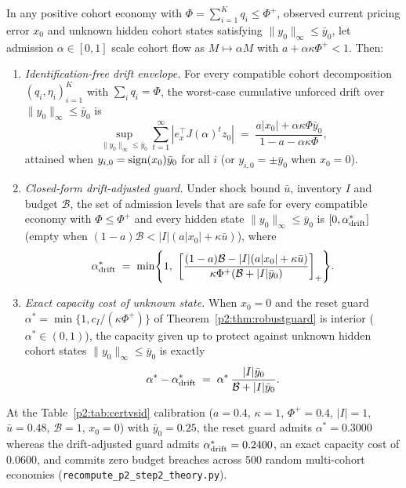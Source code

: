 \begin{proposition}\label{p2:prop:driftguard}
In any positive cohort economy with $\Phi=\sum_{i=1}^K q_i\le\Phi^+$, observed current pricing error $x_0$ and unknown hidden cohort states satisfying $\|y_0\|_\infty\le\bar y_0$, let admission $\alpha\in[0,1]$ scale cohort flow as $M\mapsto\alpha M$ with $a+\alpha\kappa\Phi^+<1$. Then:
\begin{enumerate}[label=(\roman*)]
\item \emph{Identification-free drift envelope.} For every compatible cohort decomposition $(q_i,\eta_i)_{i=1}^K$ with $\sum_i q_i=\Phi$, the worst-case cumulative unforced drift over $\|y_0\|_\infty\le\bar y_0$ is
\begin{equation}\label{p2:eq:driftenv}
\sup_{\|y_0\|_\infty\le\bar y_0}\sum_{t=1}^\infty |e_x^\top J(\alpha)^t z_0|\;=\;\frac{a|x_0|+\alpha\kappa\Phi\bar y_0}{1-a-\alpha\kappa\Phi},
\end{equation}
attained when $y_{i,0}={\rm sign}(x_0)\bar y_0$ for all $i$ (or $y_{i,0}=\pm\bar y_0$ when $x_0=0$).
\item \emph{Closed-form drift-adjusted guard.} Under shock bound $\bar u$, inventory $I$ and budget $\mathcal B$, the set of admission levels that are safe for every compatible economy with $\Phi\le\Phi^+$ and every hidden state $\|y_0\|_\infty\le\bar y_0$ is $[0,\alpha_{\rm drift}^*]$ (empty when $(1-a)\mathcal B<|I|(a|x_0|+\kappa\bar u)$), where
\begin{equation}\label{p2:eq:alphadrift}
\alpha_{\rm drift}^*\;=\;\min\Biggl\{1,\ \biggl[\frac{(1-a)\mathcal B-|I|(a|x_0|+\kappa\bar u)}{\kappa\Phi^+(\mathcal B+|I|\bar y_0)}\biggr]_+\Biggr\}.
\end{equation}
\item \emph{Exact capacity cost of unknown state.} When $x_0=0$ and the reset guard $\alpha^*=\min\{1,c_I/(\kappa\Phi^+)\}$ of Theorem~\ref{p2:thm:robustguard} is interior ($\alpha^*\in(0,1)$), the capacity given up to protect against unknown hidden cohort states $\|y_0\|_\infty\le\bar y_0$ is exactly
\begin{equation}\label{p2:eq:driftcost}
\alpha^*-\alpha_{\rm drift}^*\;=\;\alpha^*\,\frac{|I|\bar y_0}{\mathcal B+|I|\bar y_0}.
\end{equation}
\end{enumerate}
\end{proposition}

At the Table~\ref{p2:tab:certvsid} calibration ($a=0.4$, $\kappa=1$, $\Phi^+=0.4$, $|I|=1$, $\bar u=0.48$, $\mathcal B=1$, $x_0=0$) with $\bar y_0=0.25$, the reset guard admits $\alpha^*=0.3000$ whereas the drift-adjusted guard admits $\alpha_{\rm drift}^*=0.2400$, an exact capacity cost of $0.0600$, and commits zero budget breaches across 500 random multi-cohort economies (\texttt{recompute\_p2\_step2\_theory.py}).

